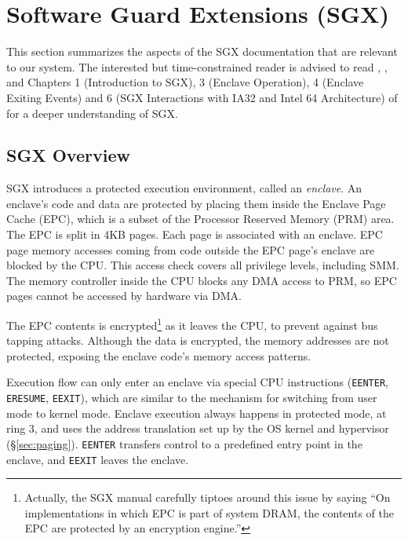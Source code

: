 \section{Software Guard Extensions (SGX)}
\label{sec:sgx}

This section summarizes the aspects of the SGX documentation that are relevant
to our system. The interested but time-constrained reader is advised to read
\cite{mckeen2013innovative}, \cite{anati2013sgx}, and Chapters 1 (Introduction
to SGX), 3 (Enclave Operation), 4 (Enclave Exiting Events) and 6 (SGX
Interactions with IA32 and Intel 64 Architecture) of \cite{intel2013sgxmanual}
for a deeper understanding of SGX.


\subsection{SGX Overview}
\label{sec:sgx_overview}

SGX introduces a protected execution environment, called an \textit{enclave}.
An enclave's code and data are protected by placing them inside the Enclave
Page Cache (EPC), which is a subset of the Processor Reserved Memory (PRM)
area. The EPC is split in 4KB pages. Each page is associated with an enclave.
EPC page memory accesses coming from code outside the EPC page's enclave are
blocked by the CPU. This access check covers all privilege levels, including
SMM. The memory controller inside the CPU blocks any DMA access to PRM, so EPC
pages cannot be accessed by hardware via DMA.

The EPC contents is encrypted\footnote{Actually, the SGX manual carefully
tiptoes around this issue by saying ``On implementations in which EPC is part
of system DRAM, the contents of the EPC are protected by an encryption
engine.''} as it leaves the CPU, to prevent against bus tapping attacks.
Although the data is encrypted, the memory addresses are not protected,
exposing the enclave code's memory access patterns.

Execution flow can only enter an enclave via special CPU instructions
(\texttt{EENTER}, \texttt{ERESUME}, \texttt{EEXIT}), which are similar to the
mechanism for switching from user mode to kernel mode. Enclave execution always
happens in protected mode, at ring 3, and uses the address translation set up
by the OS kernel and hypervisor (\S \ref{sec:paging}). \texttt{EENTER}
transfers control to a predefined entry point in the enclave, and
\texttt{EEXIT} leaves the enclave.

